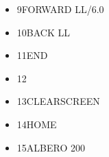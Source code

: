 \begin{minipage}{0.8\textwidth}
\begin{itemize}[itemsep=-3pt,parsep=2pt]
\item[] \hspace{0.5cm}  9\hspace{8pt}\hspace{8pt}FORWARD LL/6.0
\item[] \hspace{0.3cm} 10\hspace{8pt}\hspace{8pt}BACK LL                               
\item[] \hspace{0.3cm} 11\hspace{8pt}END
\item[] \hspace{0.3cm} 12\hspace{8pt}
\item[] \hspace{0.3cm} 13\hspace{8pt}CLEARSCREEN
\item[] \hspace{0.3cm} 14\hspace{8pt}HOME
\item[] \hspace{0.3cm} 15\hspace{8pt}ALBERO 200 
\end{itemize}
\end{minipage}                       

\vskip 1cm

